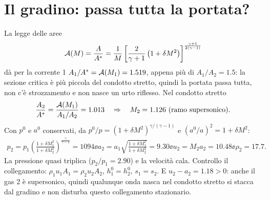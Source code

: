 \section*{Il gradino: passa tutta la portata?}
La legge delle aree
\[
  \mathcal{A}(M)=\frac{A}{A^*}=\frac1M\left[\frac{2}{\gamma+1}\left(1+\delta M^2\right)\right]^{\frac{\gamma+1}{2(\gamma-1)}}
\]
dà per la corrente 1 $A_1/A^*=\mathcal{A}(M_1)=\num{1.519}$, appena più di $A_1/A_2=\num{1.5}$: la sezione critica è più
piccola del condotto stretto, quindi la portata passa tutta, non c'è strozzamento e non nasce un urto riflesso.
Nel condotto stretto
\[
  \frac{A_2}{A^*}=\frac{\mathcal{A}(M_1)}{A_1/A_2}=\num{1.013}\quad\Rightarrow\quad M_2=\num{1.126}\ \text{(ramo supersonico)}.
\]
Con $p^0$ e $a^0$ conservati, da $p^0/p=(1+\delta M^2)^{\gamma/(\gamma-1)}$ e $(a^0/a)^2=1+\delta M^2$:
\begin{gather*}
  p_2=p_1\left(\frac{1+\delta M_1^2}{1+\delta M_2^2}\right)^{\frac{\gamma}{\gamma-1}}=\num{1094}\ee
  a_2=a_1\sqrt{\frac{1+\delta M_1^2}{1+\delta M_2^2}}=\num{9.30}\ee u_2=M_2a_2=\num{10.48}\ee \rho_2=\num{17.7}.
\end{gather*}
La pressione quasi triplica ($p_2/p_1=\num{2.90}$) e la velocità cala. Controllo il collegamento: $\rho_1u_1A_1=\rho_2u_2A_2$,
$h^0_1=h^0_2$, $s_1=s_2$. E $u_2-a_2=\num{1.18}>0$: anche il gas 2 è supersonico, quindi qualunque onda nasca nel
condotto stretto si stacca dal gradino e non disturba questo collegamento stazionario.

